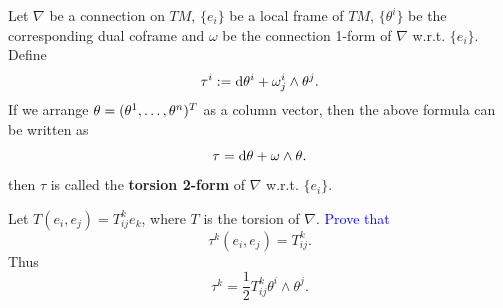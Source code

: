 \begin{exercise}
    Let $\nabla$ be a connection on $TM$, $\{e_i\}$ be a local frame of $TM$, 
    $\{\theta^i\}$ be the corresponding dual coframe 
    and $\omega$ be the connection 1-form of $\nabla$ w.r.t. $\{e_i\}$. 
    Define 
    \begin{equation*}
        \tau^i := {\rm d}\theta^i + \omega_j^i \wedge \theta^j.    
    \end{equation*}
    If we arrange $\theta=({\theta}^{1},\dots,{\theta}^{n})^T$ as a column vector, then the above formula can be written as
    \begin{equation*}
        \tau = {\rm d}\theta + \omega \wedge \theta.
    \end{equation*}
    then $\tau$ is called the \textbf{torsion 2-form} of $\nabla$ w.r.t. $\{e_i\}$. 

    Let $T(e_i,e_j) = T_{ij}^k e_k$, where $T$ is the torsion of $\nabla$. \textcolor{blue}{Prove that} 
    \begin{equation*}
        \tau^k(e_i,e_j) = T_{ij}^k.
    \end{equation*}
    Thus 
    \begin{equation*}
        \tau^k = \frac{1}{2} T_{ij}^k \theta^i \wedge \theta^j.
    \end{equation*}
\end{exercise}


